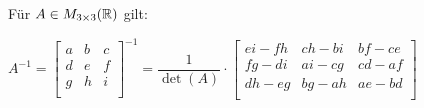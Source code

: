 \begin{multicols*}{3}
    Für $A \in M_{3 \times 3}(\mathbb{R})$ gilt:

    \begin{center}
        $A^{-1} = \begin{bmatrix}
                a & b & c \\
                d & e & f \\
                g & h & i \\
            \end{bmatrix}^{-1} = \dfrac{1}{\det(A)} \cdot
            \begin{bmatrix}
                ei - fh & ch - bi & bf - ce \\
                fg - di & ai - cg & cd - af \\
                dh - eg & bg - ah & ae - bd \\
            \end{bmatrix}$
    \end{center}
\end{multicols*}


